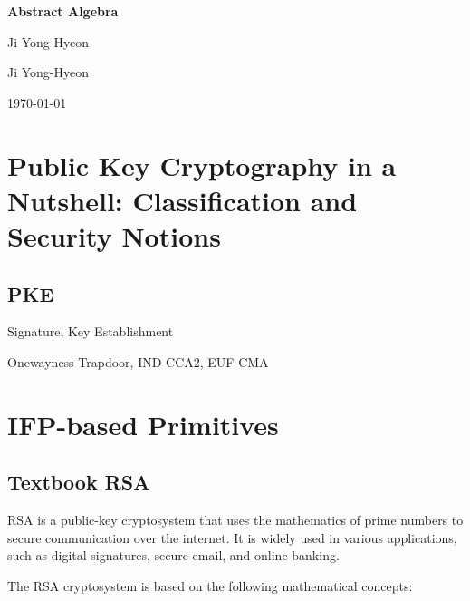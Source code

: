\documentclass[12pt,openany]{book}
\begin{document}
	
	\begin{titlepage}
		\begin{center}
			{\Huge\textsf{\textbf{Abstract Algebra}}\par}
			\vspace{0.5in}
			{\Large Ji Yong-Hyeon\par}
			\vspace{1in}
			\vspace{1in}
			{\large Ji Yong-Hyeon\par}
			{\large \today\par}
		\end{center}
	\end{titlepage}
	
	\tableofcontents
	
	\mainmatter
	
	\chapter{Public Key Cryptography in a Nutshell: Classification and Security Notions}
	
	\section{PKE}
	Signature, Key Establishment
	
	Onewayness Trapdoor, IND-CCA2, EUF-CMA
	
	
	\newpage
	\chapter{IFP-based Primitives}
	
	\section{Textbook RSA}
	
	RSA is a public-key cryptosystem that uses the mathematics of prime numbers to secure communication over the internet. It is widely used in various applications, such as digital signatures, secure email, and online banking.
	
	The RSA cryptosystem is based on the following mathematical concepts:
	
\end{document}
